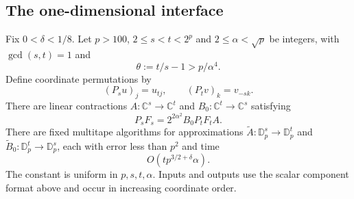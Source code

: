 \subsection{The one-dimensional interface}

\begin{lemma}
\label{lem:no-sort-resampling}
Fix $0<\delta<1/8$. Let $p>100$, $2\leq s<t<2^p$ and $2\leq\alpha<\sqrt p$
be integers, with $\gcd(s,t)=1$ and
\[
 \theta:=t/s-1>p/\alpha^4.
\]
Define coordinate permutations by
\[
 (P_su)_j=u_{tj},\qquad (P_tv)_k=v_{-sk}.
\]
There are linear contractions $A:\mathbb C^s\to\mathbb C^t$ and
$B_0:\mathbb C^t\to\mathbb C^s$ satisfying
\begin{equation}
 P_sF_s=2^{2\alpha^2}B_0P_tF_tA.
 \label{eq:no-sort-one-dimensional}
\end{equation}
There are fixed multitape algorithms for approximations
$\widetilde A:\mathbb D_p^s\to\mathbb D_p^t$ and
$\widetilde B_0:\mathbb D_p^t\to\mathbb D_p^s$, each with error less
than $p^2$ and time
\[
 O(tp^{3/2+\delta}\alpha).
\]
The constant is uniform in $p,s,t,\alpha$. Inputs and outputs use the
scalar component format above and occur in increasing coordinate order.
\end{lemma}

